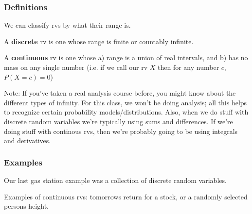 \documentclass{beamer}
\begin{document}
\begin{frame}
\frametitle{Definitions}

We can classify rvs by what their range is. 
\newline

A \textbf{discrete} rv is one whose range is finite or countably infinite.
\newline

A \textbf{continuous} rv is one whose a) range is a union of real intervals, and b) has no mass on any single number (i.e. if we call our rv $X$ then for any number $c$, $P(X=c) = 0$)
\newline

Note: If you've taken a real analysis course before, you might know about the different types of infinity. For this class, we won't be doing analysis; all this helps to recognize certain probability models/distributions. Also, when we do stuff with discrete random variables we're typically using sums and differences. If we're doing stuff with continous rvs, then we're probably going to be using integrals and derivatives.

\end{frame}

\begin{frame}
\frametitle{Examples}

Our last gas station example was a collection of discrete random variables. 
\newline

Examples of continuous rvs: tomorrows return for a stock, or a randomly selected persons height. 


\end{frame}
\end{document}
